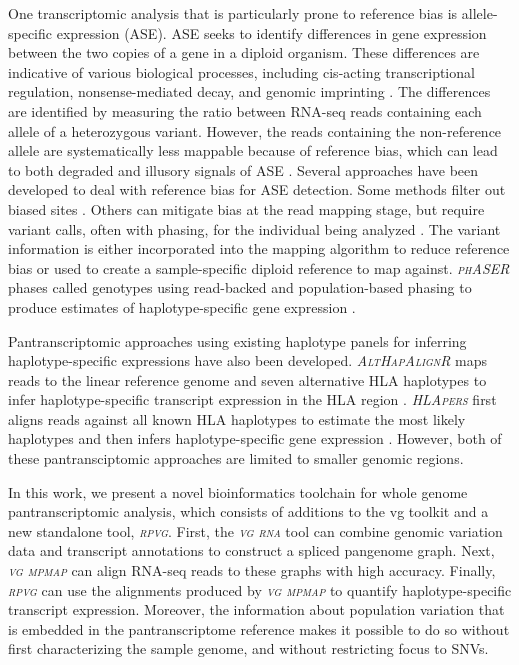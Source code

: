 \documentclass[11pt]{ucthesis}
\newcommand{\tool}[1]{\emph{\textsc{#1}}}
\begin{document}
One transcriptomic analysis that is particularly prone to reference bias is allele-specific expression (ASE). ASE seeks to identify differences in gene expression between the two copies of a gene in a diploid organism. These differences are indicative of various biological processes, including cis-acting transcriptional regulation, nonsense-mediated decay, and genomic imprinting \cite{zink2018insights,castel2015tools}. The differences are identified by measuring the ratio between RNA-seq reads containing each allele of a heterozygous variant. However, the reads containing the non-reference allele are systematically less mappable because of reference bias, which can lead to both degraded and illusory signals of ASE \cite{degner2009effect}. Several approaches have been developed to deal with reference bias for ASE detection. Some methods filter out biased sites \cite{van2015wasp}. Others can mitigate bias at the read mapping stage, but require variant calls, often with phasing, for the individual being analyzed \cite{rozowsky2011alleleseq,miao2018aselux,raghupathy2018hierarchical}. The variant information is either incorporated into the mapping algorithm to reduce reference bias or used to create a sample-specific diploid reference to map against. \tool{phASER} phases called genotypes using read-backed and population-based phasing to produce estimates of haplotype-specific gene expression \cite{castel2016rare}. 

Pantranscriptomic approaches using existing haplotype panels for inferring haplotype-specific expressions have also been developed. \tool{AltHapAlignR} maps reads to the linear reference genome and seven alternative HLA haplotypes to infer haplotype-specific transcript expression in the HLA region \cite{lee2018althapalignr}. \tool{HLApers} first aligns reads against all known HLA haplotypes to estimate the most likely haplotypes and then infers haplotype-specific gene expression \cite{Aguiar2019-fy}. However, both of these pantransciptomic approaches are limited to smaller genomic regions. 

In this work, we present a novel bioinformatics toolchain for whole genome pantranscriptomic analysis, which consists of additions to the vg toolkit and a new standalone tool, \tool{rpvg}. First, the \tool{vg rna} tool can combine genomic variation data and transcript annotations to construct a spliced pangenome graph. Next, \tool{vg mpmap} can align RNA-seq reads to these graphs with high accuracy. Finally, \tool{rpvg} can use the alignments produced by \tool{vg mpmap} to quantify haplotype-specific transcript expression. Moreover, the information about population variation that is embedded in the pantranscriptome reference makes it possible to do so without first characterizing the sample genome, and without restricting focus to SNVs.
\end{document}
